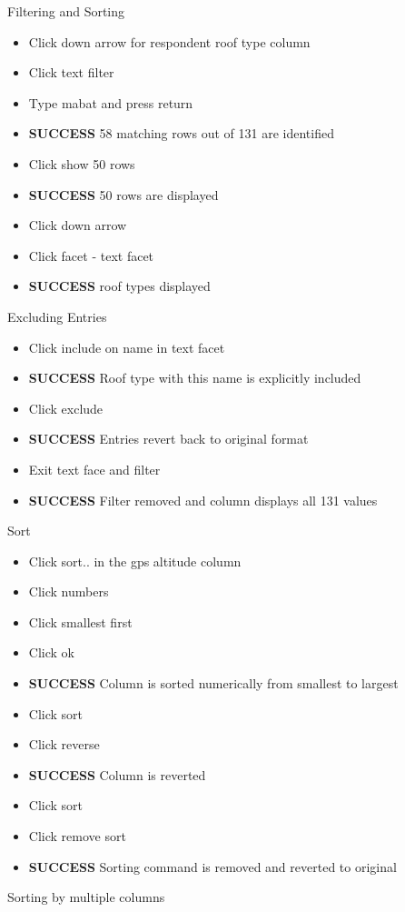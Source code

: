 \documentclass{article}
\begin{document}
Filtering and Sorting 
\begin{itemize}
\item Click down arrow for respondent roof type column
\item Click text filter
\item Type mabat and press return
\item \textbf{SUCCESS} 58 matching rows out of 131 are identified
\item Click show 50 rows
\item \textbf{SUCCESS} 50 rows are displayed
\item Click down arrow
\item Click facet - text facet
\item \textbf{SUCCESS} roof types displayed
\end{itemize}
Excluding Entries
\begin{itemize}
\item Click include on name in text facet
\item \textbf{SUCCESS} Roof type with this name is explicitly included 
\item Click exclude
\item \textbf{SUCCESS} Entries revert back to original format
\item Exit text face and filter
\item \textbf{SUCCESS} Filter removed and column displays all 131 values
\end{itemize}
Sort
\begin{itemize}
\item Click sort.. in the gps altitude column 
\item Click numbers
\item Click smallest first
\item Click ok
\item \textbf{SUCCESS} Column is sorted numerically from smallest to largest 
\item Click sort
\item Click reverse
\item \textbf{SUCCESS} Column is reverted
\item Click sort 
\item Click remove sort
\item \textbf{SUCCESS} Sorting command is removed and reverted to original
\end{itemize}
Sorting by multiple columns
\end{document}
